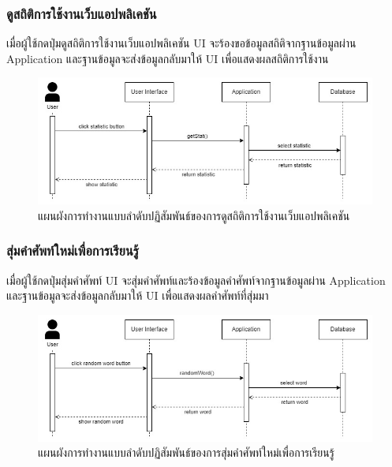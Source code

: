 \documentclass[12pt,oneside,openright,a4paper]{cpe-thai-project}
\begin{document}
\pagebreak
\subsubsection{ดูสถิติการใช้งานเว็บแอปพลิเคชัน}
\hspace{1cm}
เมื่อผู้ใช้กดปุ่มดูสถิติการใช้งานเว็บแอปพลิเคชัน UI จะร้องขอข้อมูลสถิติจากฐานข้อมูลผ่าน Application
และฐานข้อมูลจะส่งข้อมูลกลับมาให้ UI เพื่อแสดงผลสถิติการใช้งาน
\begin{figure}[!h]\centering
	\includegraphics[width=\textwidth, keepaspectratio=true]{image/chap3/sequence/Statistic.jpg}
	\caption{แผนผังการทำงานแบบลำดับปฏิสัมพันธ์ของการดูสถิติการใช้งานเว็บแอปพลิเคชัน}\label{fig:S_Statistic}
\end{figure}

\subsubsection{สุ่มคำศัพท์ใหม่เพื่อการเรียนรู้}
\hspace{1cm}
เมื่อผู้ใช้กดปุ่มสุ่มคำศัพท์ UI จะสุ่มคำศัพท์และร้องข้อมูลคำศัพท์จากฐานข้อมูลผ่าน Application
และฐานข้อมูลจะส่งข้อมูลกลับมาให้ UI เพื่อแสดงผลคำศัพท์ที่สุ่มมา
\begin{figure}[!h]\centering
	\includegraphics[width=\textwidth, keepaspectratio=true]{image/chap3/sequence/Random word.jpg}
	\caption{แผนผังการทำงานแบบลำดับปฏิสัมพันธ์ของการสุ่มคำศัพท์ใหม่เพื่อการเรียนรู้}\label{fig:S_RandomWord}
\end{figure}
\end{document}
